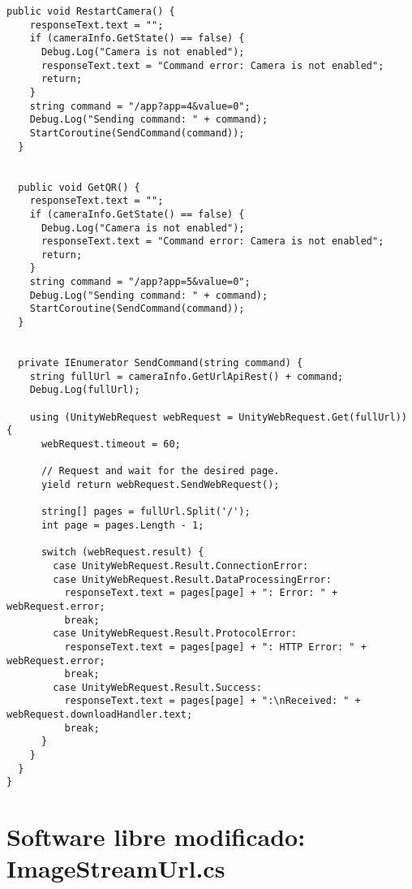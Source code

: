 \begin{lstlisting}[label={lst:CameraNetworkCommandControllerCode}, caption={Código de CameraNetworkCommandController}]
  public void RestartCamera() {
    responseText.text = "";
    if (cameraInfo.GetState() == false) {
      Debug.Log("Camera is not enabled");
      responseText.text = "Command error: Camera is not enabled";
      return;
    }
    string command = "/app?app=4&value=0";
    Debug.Log("Sending command: " + command);
    StartCoroutine(SendCommand(command));
  }


  public void GetQR() {
    responseText.text = "";
    if (cameraInfo.GetState() == false) {
      Debug.Log("Camera is not enabled");
      responseText.text = "Command error: Camera is not enabled";
      return;
    }
    string command = "/app?app=5&value=0";
    Debug.Log("Sending command: " + command);
    StartCoroutine(SendCommand(command));
  }


  private IEnumerator SendCommand(string command) {
    string fullUrl = cameraInfo.GetUrlApiRest() + command;
    Debug.Log(fullUrl);

    using (UnityWebRequest webRequest = UnityWebRequest.Get(fullUrl)) {
      webRequest.timeout = 60;

      // Request and wait for the desired page.
      yield return webRequest.SendWebRequest();

      string[] pages = fullUrl.Split('/');
      int page = pages.Length - 1;

      switch (webRequest.result) {
        case UnityWebRequest.Result.ConnectionError:
        case UnityWebRequest.Result.DataProcessingError:
          responseText.text = pages[page] + ": Error: " + webRequest.error;
          break;
        case UnityWebRequest.Result.ProtocolError:
          responseText.text = pages[page] + ": HTTP Error: " + webRequest.error;
          break;
        case UnityWebRequest.Result.Success:
          responseText.text = pages[page] + ":\nReceived: " + webRequest.downloadHandler.text;
          break;
      }
    }
  }
}

\end{lstlisting}



\section{Software libre modificado: ImageStreamUrl.cs}
\label{appendix:imagestreamurl}

